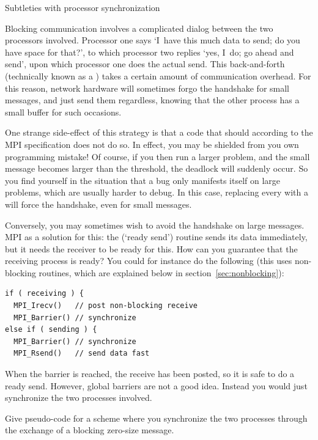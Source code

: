 
 {Subtleties with processor synchronization}
\label{sec:handshake}

Blocking communication involves a complicated dialog between the two
processors involved. Processor one says `I~have this much data to
send; do you have space for that?', to which processor two replies
`yes, I~do; go ahead and send', upon which processor one does the
actual send. This back-and-forth (technically known as
a ) takes a certain amount of communication
overhead. For this reason, network hardware will sometimes forgo the
handshake for small messages, and just send them regardless, knowing
that the other process has a small buffer for such occasions.


One strange side-effect of this strategy is that a code that
should  according to the MPI specification does
not do so. In effect, you may be shielded from you own programming
mistake! Of course, if you then run a larger problem, and the small
message becomes larger than the threshold, the deadlock will suddenly
occur. So you find yourself in the situation that a bug only manifests
itself on large problems, which are usually harder to debug. In this
case, replacing every  with a  will force the
handshake, even for small messages.

Conversely, you may sometimes wish to avoid the handshake on large
messages. MPI as a solution for this: the  (`ready
send') routine sends its data immediately, but it needs the receiver
to be ready for this. How can you guarantee that the receiving process
is ready? You could for instance do the following (this uses
non-blocking routines, which are explained below in
section~\ref{sec:nonblocking}):
\begin{lstlisting}
if ( receiving ) {
  MPI_Irecv()   // post non-blocking receive
  MPI_Barrier() // synchronize
else if ( sending ) {
  MPI_Barrier() // synchronize
  MPI_Rsend()   // send data fast
\end{lstlisting}
When the barrier is reached, the receive has been posted, so it is safe 
to do a ready send. However, global barriers are not a good idea.
Instead you would just synchronize the two processes involved.
\begin{exercise}
  Give pseudo-code for a scheme where you synchronize the two
  processes through the exchange of a blocking zero-size message.
\end{exercise}

